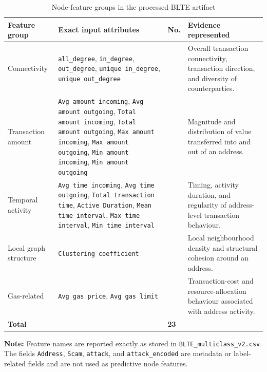 \documentclass{ieeeaccess}
\begin{document}
\begin{table}[t]
\centering
\caption{Node-feature groups in the processed BLTE artifact}
\label{tab:blte_features}

\renewcommand{\arraystretch}{1.15}
\setlength{\tabcolsep}{4pt}
\scriptsize

\begin{tabularx}{\textwidth}{
>{\raggedright\arraybackslash}p{2.45cm}
>{\raggedright\arraybackslash}X
>{\centering\arraybackslash}p{0.9cm}
>{\raggedright\arraybackslash}p{4.0cm}
}

\toprule
\textbf{Feature group} &
\textbf{Exact input attributes} &
\textbf{No.} &
\textbf{Evidence represented} \\
\midrule

Connectivity
&
\texttt{all\_degree},
\texttt{in\_degree},
\texttt{out\_degree},
\texttt{unique in\_degree},
\texttt{unique out\_degree}
&
5
&
Overall transaction connectivity, transaction direction, and diversity of counterparties.
\\[2pt]

Transaction amount
&
\texttt{Avg amount incoming},
\texttt{Avg amount outgoing},
\texttt{Total amount incoming},
\texttt{Total amount outgoing},
\texttt{Max amount incoming},
\texttt{Max amount outgoing},
\texttt{Min amount incoming},
\texttt{Min amount outgoing}
&
8
&
Magnitude and distribution of value transferred into and out of an address.
\\[2pt]

Temporal activity
&
\texttt{Avg time incoming},
\texttt{Avg time outgoing},
\texttt{Total transaction time},
\texttt{Active Duration},
\texttt{Mean time interval},
\texttt{Max time interval},
\texttt{Min time interval}
&
7
&
Timing, activity duration, and regularity of address-level transaction behaviour.
\\[2pt]

Local graph structure
&
\texttt{Clustering coefficient}
&
1
&
Local neighbourhood density and structural cohesion around an address.
\\[2pt]

Gas-related
&
\texttt{Avg gas price},
\texttt{Avg gas limit}
&
2
&
Transaction-cost and resource-allocation behaviour associated with address activity.
\\

\midrule
\textbf{Total}
&
&
\textbf{23}
&
\\
\bottomrule

\end{tabularx}

\vspace{2pt}

\begin{minipage}{0.97\textwidth}
\scriptsize
\textbf{Note:} Feature names are reported exactly as stored in
\texttt{BLTE\_multiclass\_v2.csv}. The fields
\texttt{Address}, \texttt{Scam}, \texttt{attack}, and
\texttt{attack\_encoded} are metadata or label-related fields and are not used as predictive node features.
\end{minipage}

\end{table}
\end{document}
